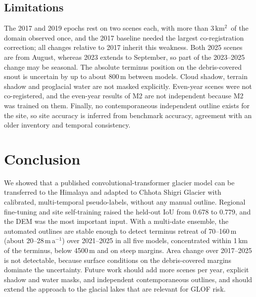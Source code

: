 \documentclass[pdflatex,sn-mathphys-num]{sn-jnl}%
\theoremstyle{thmstyleone}%
\theoremstyle{thmstyletwo}%
\theoremstyle{thmstylethree}%
\newcommand{\kmsq}{km$^2$}
\begin{document}
\subsection{Limitations}\label{subsec5.3}

The 2017 and 2019 epochs rest on two scenes each, with more than 3\,\kmsq\ of the domain observed once, and the 2017 baseline needed the largest co-registration correction; all changes relative to 2017 inherit this weakness. Both 2025 scenes are from August, whereas 2023 extends to September, so part of the 2023--2025 change may be seasonal. The absolute terminus position on the debris-covered snout is uncertain by up to about 800\,m between models. Cloud shadow, terrain shadow and proglacial water are not masked explicitly. Even-year scenes were not co-registered, and the even-year results of M2 are not independent because M2 was trained on them. Finally, no contemporaneous independent outline exists for the site, so site accuracy is inferred from benchmark accuracy, agreement with an older inventory and temporal consistency.

\section{Conclusion}\label{sec6}

We showed that a published convolutional-transformer glacier model can be transferred to the Himalaya and adapted to Chhota Shigri Glacier with calibrated, multi-temporal pseudo-labels, without any manual outline. Regional fine-tuning and site self-training raised the held-out IoU from 0.678 to 0.779, and the DEM was the most important input. With a multi-date ensemble, the automated outlines are stable enough to detect terminus retreat of 70--160\,m (about 20--28\,m\,a$^{-1}$) over 2021--2025 in all five models, concentrated within 1\,km of the terminus, below 4500\,m and on steep margins. Area change over 2017--2025 is not detectable, because surface conditions on the debris-covered margins dominate the uncertainty. Future work should add more scenes per year, explicit shadow and water masks, and independent contemporaneous outlines, and should extend the approach to the glacial lakes that are relevant for GLOF risk.

\backmatter

\end{document}

